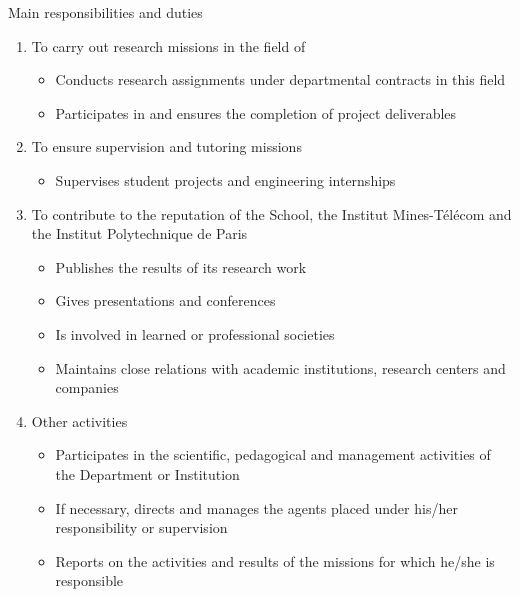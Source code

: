 \begin{graybox}{Main responsibilities and duties}

\begin{enumerate}
    \item To carry out research missions in the field of \textbf{\subtask{}}
        \begin {itemize}
            \item Conducts research assignments under departmental contracts in this field
            \item Participates in and ensures the completion of project deliverables
        \end{itemize}

    \item To ensure supervision and tutoring missions
        \begin{itemize}
            \item      Supervises student projects and engineering internships
        \end{itemize}

    \item To contribute to the reputation of the School, the Institut Mines-Télécom and the Institut Polytechnique de Paris

        \begin{itemize}
            \item Publishes the results of its research work
            \item     Gives presentations and conferences
            \item     Is involved in learned or professional societies
            \item     Maintains close relations with academic institutions, research centers and companies
        
        \end{itemize}

    \item Other activities

        \begin{itemize}
            \item Participates in the scientific, pedagogical and management activities of the Department or Institution
            \item      If necessary, directs and manages the agents placed under his/her responsibility or supervision
            \item      Reports on the activities and results of the missions for which he/she is responsible
\end{itemize}


\end{enumerate}


\end{graybox}






